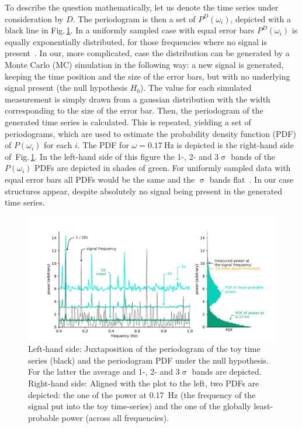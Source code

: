 To describe the question mathematically, let us denote the time series under consideration by $D$. The periodogram is then a set of $P^D(\omega_i)$, depicted with a black line in Fig.\,\ref{fig:basic_detection}. In a uniformly sampled case with equal error bars $P^D(\omega_i)$ is equally exponentially distributed, for those frequencies where no signal is present~\cite{Scargle1982}. In our, more complicated, case the distribution can be generated by a Monte Carlo (MC) simulation in the following way: a new signal is generated, keeping the time position and the size of the error bars, but with no underlying signal present (the null hypothesis $H_0$). The value for each simulated measurement is simply drawn from a gaussian distribution with the width corresponding to the size of the error bar. Then, the periodogram of the generated time series is calculated. This is repeated, yielding a set of periodograms, which are used to estimate the probability density function (PDF) of $P(\omega_i)$ for each $i$. The PDF for $\omega = \SI{0.17}{\hertz}$ is depicted is the right-hand side of~Fig.\,\ref{fig:basic_detection}. In the left-hand side of this figure the 1-, 2- and 3$\upsigma$ bands of the $P(\omega_i)$ PDFs are depicted in shades of green. For uniformly sampled data with equal error bars all PDFs would be the same and the $\upsigma$ bands flat~\cite{Scargle1982}. In our case structures appear, despite absolutely no signal being present in the generated time series.

\begin{figure}
  \centering \includegraphics[width=\linewidth]{gfx/axions/basic_detection.pdf}
  \caption{Left-hand side: Juxtaposition of the periodogram of the toy time series (black) and the periodogram PDF under the null hypothesis. For the latter the average and 1-, 2- and 3$\upsigma$ bands are depicted. Right-hand side: Aligned with the plot to the left, two PDFs are depicted: the one of the power at \SI{0.17}{\hertz} (the frequency of the signal put into the toy time-series) and the one of the globally least-probable power (across all frequencies).}\label{fig:basic_detection}
\end{figure}

